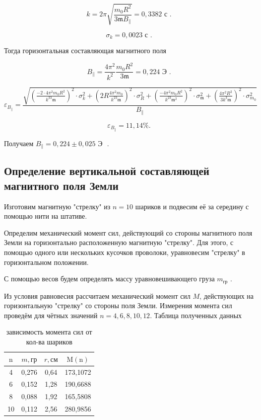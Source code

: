 \documentclass[a4paper, 12pt]{article}%
\begin{document}
\[k = 2\pi \sqrt{\frac{m_0 R^{2}}{3 \mathfrak{m} B_{\|}}} = 0,3382 \text{ с } . \]

\[ \sigma_k = 0,0023\text{ с } .\]

Тогда горизонтальная составляющая магнитного поля 

\[B_{\|} = \frac{4\pi^2}{k^2}\frac{m_0R^2}{3\mathfrak{m}} = 0,224 \text{ Э }. \]

\[ \varepsilon_{B_{\|}} = \frac{\sqrt{ (\frac{-2\cdot 4\pi^2m_0R^2}{k^33\mathfrak{m}})^2\cdot \sigma^2_k + (2R\frac{4\pi^2 m_0}{k^23\mathfrak{m}})^2\cdot \sigma^2_{R} + (\frac{-4\pi^2 m_0R^2}{k^23\mathfrak{m}^2})^2\cdot \sigma^2_{\mathfrak{m}} + (\frac{4\pi^2R^2}{3k^3\mathfrak{m}})^2\cdot \sigma^2_{m_0} }}{B_{\|}}\]

\[ \varepsilon_{B_{\|}} = 11,14\% .\]

Получаем $B_{\|} = 0,224 \pm 0,025 \text{ Э }$ .

\subsection{Определение вертикальной составляющей магнитного поля Земли}

Изготовим магнитную "стрелку" из $n = 10$ шариков и подвесим её за середину с помощью нити на штативе. 

Определим механический момент сил, действующий со стороны магнитного поля Земли на горизонтально расположенную магнитную "стрелку". Для этого, с помощью одного или нескольких кусоч­ков проволоки, уравновесим "стрелку" в горизонтальном положении.

С помощью весов будем определять массу уравновешивающего груза $m_{\text{гр}}$ .

Из условия равновесия рассчитаем механический момент сил $M$, действующих на горизонтальную "стрелку" со стороны поля Земли. Измерения момента сил проведём для чётных значений $n = 4, 6, 8, 10, 12$. Таблица полученных данных

\begin{table}[!h]
\begin{center}
\begin{tabular}{|c|c|c|c|}
\hline $\mathrm{n}$ & $m, \text{гр}$ & $r, \text{см}$ & $\mathrm{M}(\mathrm{n})$ \\
\hline 4 & 0,276 & 0,64 & 173,1072 \\
\hline 6 & 0,152 & 1,28 & 190,6688 \\
\hline 8 & 0,088 & 1,92 & 165,5808 \\
\hline 10 & 0,112 & 2,56 & 280,9856 \\
\hline
\end{tabular}
\caption{зависимость момента сил от кол-ва шариков}
\end{center}
\end{table}
\end{document}
